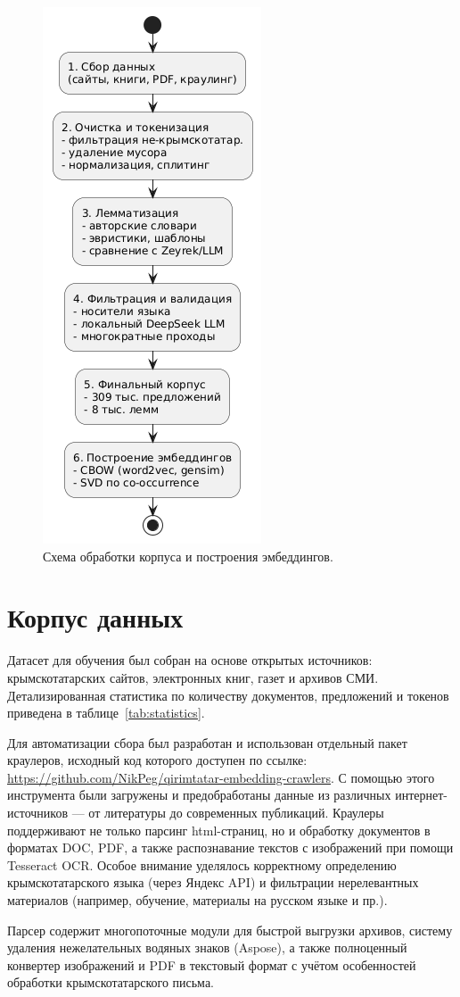 \documentclass{article}
\begin{document}
\begin{figure}[!tbh]
    \centering
    \includegraphics[width=0.3\linewidth]{pipeline.png}
    \caption{Схема обработки корпуса и построения эмбеддингов.}
    \label{fig:flowchart}
\end{figure}

\section{Корпус данных}

Датасет для обучения был собран на основе открытых источников: крымскотатарских сайтов, электронных книг, газет и архивов СМИ. Детализированная статистика по количеству документов, предложений и токенов приведена в таблице~\ref{tab:statistics}.

Для автоматизации сбора был разработан и использован отдельный пакет краулеров, исходный код которого доступен по ссылке: \url{https://github.com/NikPeg/qirimtatar-embedding-crawlers}. С помощью этого инструмента были загружены и предобработаны данные из различных интернет-источников — от литературы до современных публикаций. Краулеры поддерживают не только парсинг html-страниц, но и обработку документов в форматах DOC, PDF, а также распознавание текстов с изображений при помощи Tesseract OCR. Особое внимание уделялось корректному определению крымскотатарского языка (через Яндекс API) и фильтрации нерелевантных материалов (например, обучение, материалы на русском языке и пр.).

Парсер содержит многопоточные модули для быстрой выгрузки архивов, систему удаления нежелательных водяных знаков (Aspose), а также полноценный конвертер изображений и PDF в текстовый формат с учётом особенностей обработки крымскотатарского письма.
\end{document}
